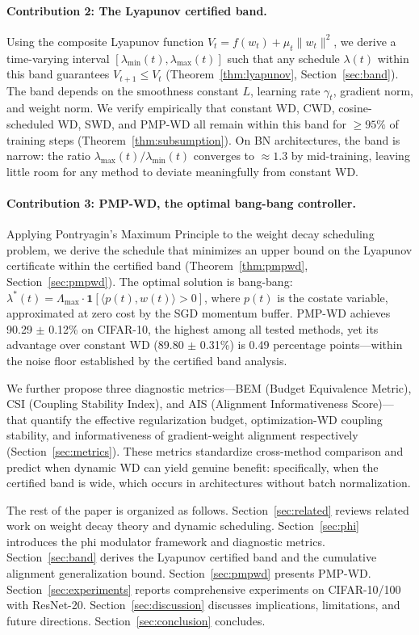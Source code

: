\documentclass{article}
\begin{document}
\paragraph{Contribution 2: The Lyapunov certified band.} Using the composite Lyapunov function $V_t = f(w_t) + \mu_t \|w_t\|^2$, we derive a time-varying interval $[\lambda_{\min}(t), \lambda_{\max}(t)]$ such that any schedule $\lambda(t)$ within this band guarantees $V_{t+1} \leq V_t$ (Theorem~\ref{thm:lyapunov}, Section~\ref{sec:band}). The band depends on the smoothness constant $L$, learning rate $\gamma_t$, gradient norm, and weight norm. We verify empirically that constant WD, CWD, cosine-scheduled WD, SWD, and PMP-WD all remain within this band for $\geq 95\%$ of training steps (Theorem~\ref{thm:subsumption}). On BN architectures, the band is narrow: the ratio $\lambda_{\max}(t) / \lambda_{\min}(t)$ converges to $\approx 1.3$ by mid-training, leaving little room for any method to deviate meaningfully from constant WD.

\paragraph{Contribution 3: PMP-WD, the optimal bang-bang controller.} Applying Pontryagin's Maximum Principle to the weight decay scheduling problem, we derive the schedule that minimizes an upper bound on the Lyapunov certificate within the certified band (Theorem~\ref{thm:pmpwd}, Section~\ref{sec:pmpwd}). The optimal solution is bang-bang: $\lambda^*(t) = \Lambda_{\max} \cdot \mathbf{1}[\langle p(t), w(t) \rangle > 0]$, where $p(t)$ is the costate variable, approximated at zero cost by the SGD momentum buffer. PMP-WD achieves 90.29 $\pm$ 0.12\% on CIFAR-10, the highest among all tested methods, yet its advantage over constant WD (89.80 $\pm$ 0.31\%) is 0.49 percentage points---within the noise floor established by the certified band analysis.

We further propose three diagnostic metrics---BEM (Budget Equivalence Metric), CSI (Coupling Stability Index), and AIS (Alignment Informativeness Score)---that quantify the effective regularization budget, optimization-WD coupling stability, and informativeness of gradient-weight alignment respectively (Section~\ref{sec:metrics}). These metrics standardize cross-method comparison and predict when dynamic WD can yield genuine benefit: specifically, when the certified band is wide, which occurs in architectures without batch normalization.

The rest of the paper is organized as follows. Section~\ref{sec:related} reviews related work on weight decay theory and dynamic scheduling. Section~\ref{sec:phi} introduces the phi modulator framework and diagnostic metrics. Section~\ref{sec:band} derives the Lyapunov certified band and the cumulative alignment generalization bound. Section~\ref{sec:pmpwd} presents PMP-WD. Section~\ref{sec:experiments} reports comprehensive experiments on CIFAR-10/100 with ResNet-20. Section~\ref{sec:discussion} discusses implications, limitations, and future directions. Section~\ref{sec:conclusion} concludes.
\end{document}
